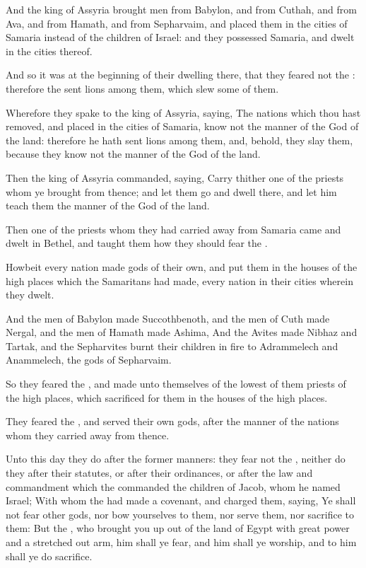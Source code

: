\Verse And the king of Assyria brought men from Babylon, and from Cuthah, and from Ava, and from Hamath, and from Sepharvaim, and placed them in the cities of Samaria instead of the children of Israel: and they possessed Samaria, and dwelt in the cities thereof.

\Verse And so it was at the beginning of their dwelling there, that they feared not the \LORD: therefore the \LORD sent lions among them, which slew some of them.

\Verse Wherefore they spake to the king of Assyria, saying, The nations which thou hast removed, and placed in the cities of Samaria, know not the manner of the God of the land: therefore he hath sent lions among them, and, behold, they slay them, because they know not the manner of the God of the land.

\Verse Then the king of Assyria commanded, saying, Carry thither one of the priests whom ye brought from thence; and let them go and dwell there, and let him teach them the manner of the God of the land.

\Verse Then one of the priests whom they had carried away from Samaria came and dwelt in Bethel, and taught them how they should fear the \LORD.

\Verse Howbeit every nation made gods of their own, and put them in the houses of the high places which the Samaritans had made, every nation in their cities wherein they dwelt.

\Verse And the men of Babylon made Succothbenoth, and the men of Cuth made Nergal, and the men of Hamath made Ashima, \Verse And the Avites made Nibhaz and Tartak, and the Sepharvites burnt their children in fire to Adrammelech and Anammelech, the gods of Sepharvaim.

\Verse So they feared the \LORD, and made unto themselves of the lowest of them priests of the high places, which sacrificed for them in the houses of the high places.

\Verse They feared the \LORD, and served their own gods, after the manner of the nations whom they carried away from thence.

\Verse Unto this day they do after the former manners: they fear not the \LORD, neither do they after their statutes, or after their ordinances, or after the law and commandment which the \LORD commanded the children of Jacob, whom he named Israel; \Verse With whom the \LORD had made a covenant, and charged them, saying, Ye shall not fear other gods, nor bow yourselves to them, nor serve them, nor sacrifice to them: \Verse But the \LORD, who brought you up out of the land of Egypt with great power and a stretched out arm, him shall ye fear, and him shall ye worship, and to him shall ye do sacrifice.

